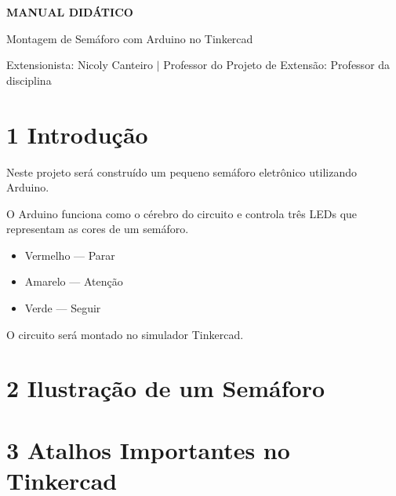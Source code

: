 \documentclass[12pt,a4paper]{article}
\begin{document}
\begin{center}

{\Large \textbf{MANUAL DIDÁTICO}}

\vspace{0.3cm}

Montagem de Semáforo com Arduino no Tinkercad

\vspace{0.3cm}

Extensionista: Nicoly Canteiro $\vert$ Professor do Projeto de Extensão: Professor da disciplina

\end{center}

\section*{1 Introdução}

\noindent
Neste projeto será construído um pequeno semáforo eletrônico utilizando Arduino.

\noindent
O Arduino funciona como o cérebro do circuito e controla três LEDs que representam as cores de um semáforo.

\begin{itemize}

\item Vermelho --- Parar
\item Amarelo --- Atenção
\item Verde --- Seguir

\end{itemize}

\noindent
O circuito será montado no simulador Tinkercad.

\section*{2 Ilustração de um Semáforo}

\begin{center}


\end{center}

\section*{3 Atalhos Importantes no Tinkercad}
\end{document}
